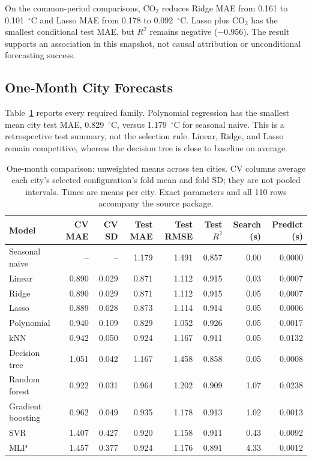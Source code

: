 \documentclass[conference]{IEEEtran}
\begin{document}
On the common-period comparisons, CO$_2$ reduces Ridge MAE from 0.161 to 0.101~$^\circ$C and Lasso MAE from 0.178 to 0.092~$^\circ$C. Lasso plus CO$_2$ has the smallest conditional test MAE, but $R^2$ remains negative ($-0.956$). The result supports an association in this snapshot, not causal attribution or unconditional forecasting success.

\subsection{One-Month City Forecasts}
Table~\ref{tab:regression} reports every required family. Polynomial regression has the smallest mean city test MAE, 0.829~$^\circ$C, versus 1.179~$^\circ$C for seasonal naive. This is a retrospective test summary, not the selection rule. Linear, Ridge, and Lasso remain competitive, whereas the decision tree is close to baseline on average.
\begin{table}[!tbp]\caption{One-month comparison: unweighted means across ten cities. CV columns average each city's selected configuration's fold mean and fold SD; they are not pooled intervals. Times are means per city. Exact parameters and all 110 rows accompany the source package.}\label{tab:regression}\centering\footnotesize
\begin{tabular}{lrrrrrrr}\toprule Model & CV MAE & CV SD & Test MAE & Test RMSE & Test $R^2$ & Search (s) & Predict (s) \\\midrule

Seasonal naive & -- & -- & 1.179 & 1.491 & 0.857 & 0.00 & 0.0000 \\
Linear & 0.890 & 0.029 & 0.871 & 1.112 & 0.915 & 0.03 & 0.0007 \\
Ridge & 0.890 & 0.029 & 0.871 & 1.112 & 0.915 & 0.05 & 0.0007 \\
Lasso & 0.889 & 0.028 & 0.873 & 1.114 & 0.914 & 0.05 & 0.0006 \\
Polynomial & 0.940 & 0.109 & 0.829 & 1.052 & 0.926 & 0.05 & 0.0017 \\
kNN & 0.942 & 0.050 & 0.924 & 1.167 & 0.911 & 0.05 & 0.0132 \\
Decision tree & 1.051 & 0.042 & 1.167 & 1.458 & 0.858 & 0.05 & 0.0008 \\
Random forest & 0.922 & 0.031 & 0.964 & 1.202 & 0.909 & 1.07 & 0.0238 \\
Gradient boosting & 0.962 & 0.049 & 0.935 & 1.178 & 0.913 & 1.02 & 0.0013 \\
SVR & 1.407 & 0.427 & 0.920 & 1.158 & 0.911 & 0.43 & 0.0092 \\
MLP & 1.457 & 0.377 & 0.924 & 1.176 & 0.891 & 4.33 & 0.0012 \\

\bottomrule\end{tabular}\end{table}
\end{document}
